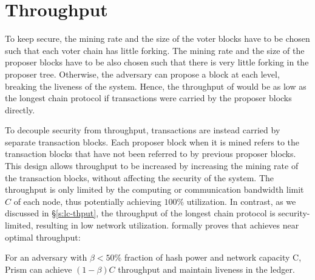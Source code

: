 \section{Throughput}
\label{sec:thruput}

To keep \prism secure, the mining rate and the size of the voter blocks have to be chosen such that each voter chain has little forking. The mining rate and the size of the proposer blocks have to be also chosen such that there is very little forking in the proposer tree. Otherwise, the adversary can propose a block at each level, breaking the liveness of the system. Hence, the throughput of \prism would be as low as the longest chain protocol if transactions were carried by the proposer blocks directly. 


To decouple security from throughput, transactions are instead carried by separate transaction blocks. Each proposer block when it is mined refers to the transaction blocks that have not been referred to by previous proposer blocks. This design allows throughput to be increased by increasing the mining rate of the transaction blocks, without affecting the security of the system. The throughput is only limited by the computing or communication bandwidth limit $C$ of each node, thus potentially achieving $100\%$ utilization. In contrast, as we discussed in \S\ref{s:lc-thput}, the throughput of the longest chain protocol is security-limited, resulting in low network utilization. \cite{prism-theory} formally proves that \prism achieves near optimal throughput:

\begin{theorem}
\label{thm:throughput} For an adversary with $\beta < 50\%$ fraction of hash power and network capacity C, Prism can achieve  $(1-\beta)C$ throughput and maintain liveness in the ledger.
\end{theorem}


